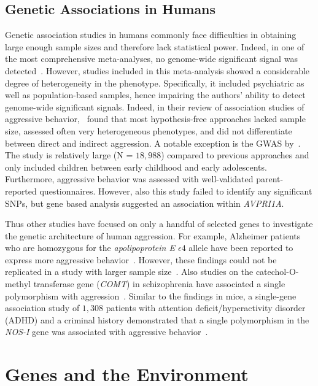 \subsection{Genetic Associations in Humans}
\label{sub:genetic_associations_in_humans}

Genetic association studies in humans commonly face difficulties in obtaining large enough sample sizes and therefore lack statistical power.
Indeed, in one of the most comprehensive meta-analyses, no genome-wide significant signal was detected~\citet{Vassos2014}.
However, studies included in this meta-analysis showed a considerable degree of heterogeneity in the phenotype.
Specifically, it included psychiatric as well as population-based samples, hence impairing the authors' ability to detect genome-wide significant signals.
Indeed, in their review of association studies of aggressive behavior,~\citet{Fernandez-Castillo2016} found that most hypothesis-free approaches lacked sample size, assessed often very heterogeneous phenotypes, and did not differentiate between direct and indirect aggression. 
A notable exception is the GWAS by~\citet{Pappa2016a}.
The study is relatively large (N = $18,988$) compared to previous approaches and only included children between early childhood and early adolescents.
Furthermore, aggressive behavior was assessed with well-validated parent-reported questionnaires. 
However, also this study failed to identify any significant SNPs, but gene based analysis suggested an association within \textit{AVPRI1A}.

Thus other studies have focused on only a handful of selected genes to investigate the genetic architecture of human aggression.
For example, Alzheimer patients who are homozygous for the \textit{apolipoprotein E $\epsilon 4$} allele have been reported to express more aggressive behavior~\cite{Craig2004,VanDerFlier2006}.
However, these findings could not be replicated in a study with larger sample size~\cite{Hollingworth2006}.
Also studies on the catechol-O-methyl transferase gene (\textit{COMT}) in schizophrenia have associated a single polymorphism with aggression~\cite{Hirata2013,Calati2011}.
Similar to the findings in mice, a single-gene association study of $1,308$ patients with attention deficit/hyperactivity disorder (ADHD) and a criminal history demonstrated that a single polymorphism in the \textit{NOS-I} gene was associated with aggressive behavior~\cite{Reif2009}.

\section{Genes and the Environment}
\label{sec:gene_environment_interactions}

